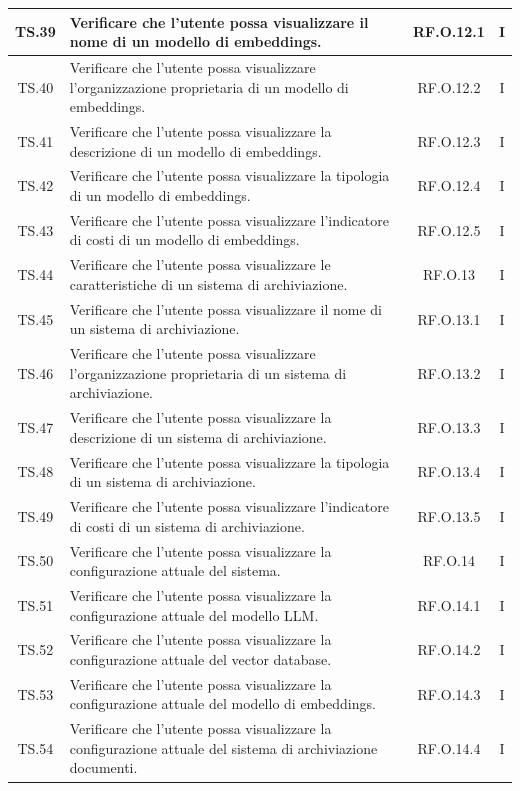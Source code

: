 \documentclass[10pt, a4paper]{article}
\begin{document}
\begin{xltabular}{\textwidth}{|c|X|c|c|}
\hline
TS.39 & Verificare che l'utente possa visualizzare il nome di un modello di embeddings. & RF.O.12.1 & I \\
\hline
TS.40 & Verificare che l'utente possa visualizzare l’organizzazione proprietaria di un modello di embeddings. & RF.O.12.2 & I \\
\hline
TS.41 & Verificare che l'utente possa visualizzare la descrizione di un modello di embeddings. & RF.O.12.3 & I \\
\hline
TS.42 & Verificare che l'utente possa visualizzare la tipologia di un modello di embeddings. & RF.O.12.4 & I \\
\hline
TS.43 & Verificare che l'utente possa visualizzare l’indicatore di costi di un modello di embeddings. & RF.O.12.5 & I \\
\hline
TS.44 & Verificare che l'utente possa visualizzare le caratteristiche di un sistema di archiviazione. & RF.O.13 & I \\
\hline
TS.45 & Verificare che l'utente possa visualizzare il nome di un sistema di archiviazione. & RF.O.13.1 & I \\
\hline
TS.46 & Verificare che l'utente possa visualizzare l’organizzazione proprietaria di un sistema di archiviazione. & RF.O.13.2 & I \\
\hline
TS.47 & Verificare che l'utente possa visualizzare la descrizione di un sistema di archiviazione. & RF.O.13.3 & I \\
\hline
TS.48 & Verificare che l'utente possa visualizzare la tipologia di un sistema di archiviazione. & RF.O.13.4 & I \\
\hline
TS.49 & Verificare che l'utente possa visualizzare l’indicatore di costi di un sistema di archiviazione. & RF.O.13.5 & I \\
\hline
TS.50 & Verificare che l'utente possa visualizzare la configurazione attuale del sistema. & RF.O.14 & I \\
\hline
TS.51 & Verificare che l'utente possa visualizzare la configurazione attuale del modello LLM. & RF.O.14.1 & I \\
\hline
TS.52 & Verificare che l'utente possa visualizzare la configurazione attuale del vector database. & RF.O.14.2 & I \\
\hline
TS.53 & Verificare che l'utente possa visualizzare la configurazione attuale del modello di embeddings. & RF.O.14.3 & I \\
\hline
TS.54 & Verificare che l'utente possa visualizzare la configurazione attuale del sistema di archiviazione documenti. & RF.O.14.4 & I \\

\end{xltabular}
\end{document}
